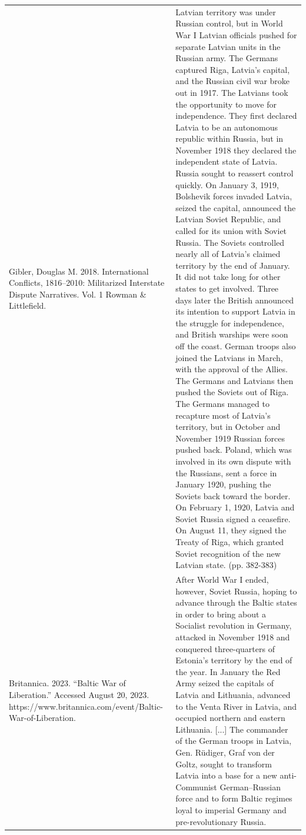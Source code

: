 {\begin{longtable}{p{}p{}}
Gibler, Douglas M. 2018. International Conflicts, 1816–2010: Militarized Interstate Dispute Narratives. Vol. 1 Rowman \& Littlefield. & Latvian territory was under Russian control, but in World War I Latvian officials pushed for separate Latvian units in the Russian army. The Germans captured Riga, Latvia's capital, and the Russian civil war broke out in 1917. The Latvians took the opportunity to move for independence. They first declared Latvia to be an autonomous republic within Russia, but in November 1918 they declared the independent state of Latvia. Russia sought to reassert control quickly. On January 3, 1919, Bolshevik forces invaded Latvia, seized the capital, announced the Latvian Soviet Republic, and called for its union with Soviet Russia. The Soviets controlled nearly all of Latvia's claimed territory by the end of January. It did not take long for other states to get involved. Three days later the British announced its intention to support Latvia in the struggle for independence, and British warships were soon off the coast. German troops also joined the Latvians in March, with the approval of the Allies. The Germans and Latvians then pushed the Soviets out of Riga. The Germans managed to recapture most of Latvia's territory, but in October and November 1919 Russian forces pushed back. Poland, which was involved in its own dispute with the Russians, sent a force in January 1920, pushing the Soviets back toward the border. On February 1, 1920, Latvia and Soviet Russia signed a ceasefire. On August 11, they signed the Treaty of Riga, which granted Soviet recognition of the new Latvian state. (pp. 382-383)
\\
Britannica. 2023. “Baltic War of Liberation.” Accessed August 20, 2023. https://www.britannica.com/event/Baltic-War-of-Liberation. & After World War I ended, however, Soviet Russia, hoping to advance through the Baltic states in order to bring about a Socialist revolution in Germany, attacked in November 1918 and conquered three-quarters of Estonia's territory by the end of the year. In January the Red Army seized the capitals of Latvia and Lithuania, advanced to the Venta River in Latvia, and occupied northern and eastern Lithuania. [...] The commander of the German troops in Latvia, Gen. Rüdiger, Graf von der Goltz, sought to transform Latvia into a base for a new anti-Communist German–Russian force and to form Baltic regimes loyal to imperial Germany and pre-revolutionary Russia. 
\\

\end{longtable}}
